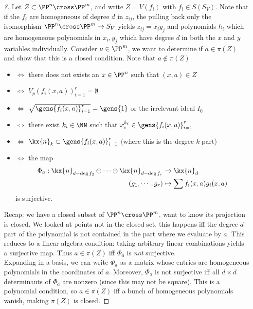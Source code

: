 \begin{proof}[?]

Let \(Z \subset \PP^n \cross \PP^m\), and write \(Z = V(f_i)\) with
\(f_i \in S(S_V)\). Note that if the \(f_i\) are homogeneous of degree
\(d\) in \(z_{ij}\), the pulling back only the isomorphism
\(\PP^n\cross \PP^m \to S_V\) yields \(z_{ij} = x_i y_j\) and
polynomials \(h_i\) which are homogeneous polynomials in \(x_i, y_j\)
which have degree \(d\) in both the \(x\) and \(y\) variables
individually. Consider \(a\in \PP^m\), we want to determine if
\(a\in \pi(Z)\) and show that this is a closed condition. Note that
\(a\not\in \pi(Z)\)

\begin{itemize}
\item
  \(\iff\) there does not exists an \(x\in \PP^n\) such that
  \((x, a) \in Z\)
\item
  \(\iff\) \(V_p(f_i(x, a))_{i=1}^r = \emptyset\)
\item
  \(\iff\) \(\sqrt{\gens{f_i(x, a)}_{i=1}^r } = \gens{1}\) or the
  irrelevant ideal \(I_0\)
\item
  \(\iff\) there exist \(k_i \in \NN\) such that
  \(x_i^{k_i} \in \gens{f_i(x, a)}_{i=1}^r\)
\item
  \(\iff\) \(\kx{n}_k \subset \gens{f_i(x, a)}_{i=1}^r\) (where this is
  the degree \(k\) part)
\item
  \(\iff\) the map
  \begin{align*}  
  \Phi_a: \kx{n}_{d - \deg f_2} \oplus \cdots \oplus \kx{n}_{d - \deg f_r} &\to \kx{n}_d \\
  (g_1, \cdots, g_r) &\mapsto \sum f_i(x, a) g_i (x, a)
  \end{align*} is surjective.
\end{itemize}

Recap: we have a closed subset of \(\PP^n \cross \PP^m\), want to know
its projection is closed. We looked at points not in the closed set,
this happens iff the degree \(d\) part of the polynomial is not
contained in the part where we evaluate by \(a\). This reduces to a
linear algebra condition: taking arbitrary linear combinations yields a
surjective map. Thus \(a\in \pi(Z)\) iff \(\Phi_a\) is \emph{not}
surjective.\\

Expanding in a basis, we can write \(\Phi_a\) as a matrix whose entries
are homogeneous polynomials in the coordinates of \(a\). Moreover,
\(\Phi_a\) is not surjective iff all \(d\times d\) determinants of
\(\Phi_a\) are nonzero (since this may not be square). This is a
polynomial condition, so \(a\in \pi(Z)\) iff a bunch of homogeneous
polynomials vanish, making \(\pi(Z)\) is closed.

\end{proof}

